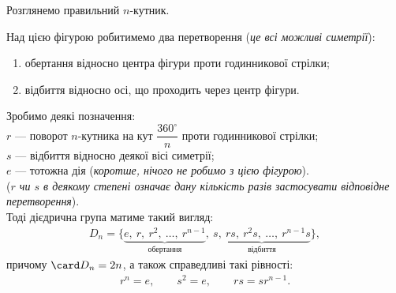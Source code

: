 \documentclass{math_library}
\begin{document}
Розглянемо правильний $n$-кутник.
\begin{figure}[H]
\centering
{}
\end{figure}
Над цією фігурою робитимемо два перетворення (\textit{це всі можливі симетрії}):
\begin{enumerate}[nosep,wide=0pt,label={\arabic*)}]
\item обертання відносно центра фігури проти годинникової стрілки;
\item відбиття відносно осі, що проходить через центр фігури.
\end{enumerate}

\begin{theorem}
Зробимо деякі позначення:\\
$r$ --- поворот $n$-кутника на кут $\dfrac{360^\circ}{n}$ проти годинникової стрілки; \\
$s$ --- відбиття відносно деякої вісі симетрії;\\
$e$ --- тотожна дія (\textit{коротше, нічого не робимо з цією фігурою}).\\
(\textit{$r$ чи $s$ в деякому степені означає дану кількість разів застосувати відповідне перетворення}).\\
Тоді дієдрична група матиме такий вигляд:
\begin{align*}
D_n = \{ \underbrace{e,\ r,\ r^2,\ \dots,\ r^{n-1}}_{\text{обертання}},\ \underbrace{s,\ rs,\ r^2s,\ \dots,\ r^{n-1}s}_{\text{відбиття}} \},
\end{align*}
причому $\card D_{n} = 2n$, а також справедливі такі рівності:
\begin{align*}
r^n = e, \qquad s^2 = e, \qquad rs = sr^{n-1}.
\end{align*}

\end{theorem}
\end{document}
